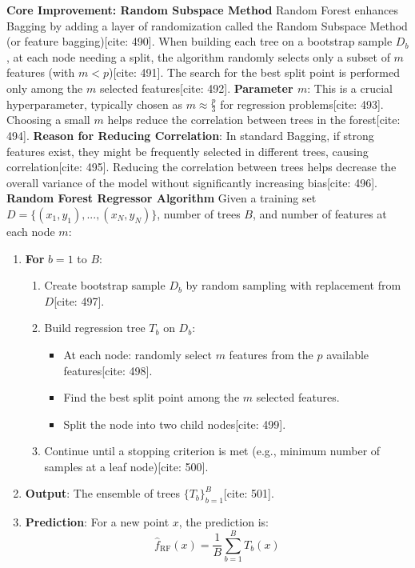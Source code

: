 \documentclass[12pt]{report}
\begin{document}
{{{\textbf*{Core Improvement: Random Subspace Method}
Random Forest enhances Bagging by adding a layer of randomization called the Random Subspace Method (or feature bagging)[cite: 490]. When building each tree on a bootstrap sample $D_b$, at each node needing a split, the algorithm randomly selects only a subset of $m$ features (with $m < p$)[cite: 491]. The search for the best split point is performed only among the $m$ selected features[cite: 492].
\textbf{Parameter $m$}: This is a crucial hyperparameter, typically chosen as $m \approx \frac{p}{3}$ for regression problems[cite: 493]. Choosing a small $m$ helps reduce the correlation between trees in the forest[cite: 494].
\textbf{Reason for Reducing Correlation}: In standard Bagging, if strong features exist, they might be frequently selected in different trees, causing correlation[cite: 495]. Reducing the correlation between trees helps decrease the overall variance of the model without significantly increasing bias[cite: 496].
\textbf*{Random Forest Regressor Algorithm}
Given a training set $D = \{(x_1, y_1), ..., (x_N, y_N)\}$, number of trees $B$, and number of features at each node $m$:

\begin{enumerate}
    \item \textbf{For} $b = 1$ to $B$:
    \begin{enumerate}
        \item Create bootstrap sample $D_b$ by random sampling with replacement from $D$[cite: 497].
        \item Build regression tree $T_b$ on $D_b$:
        \begin{itemize}
            \item At each node: randomly select $m$ features from the $p$ available features[cite: 498].
            \item Find the best split point among the $m$ selected features.
            \item Split the node into two child nodes[cite: 499].
        \end{itemize}
        \item Continue until a stopping criterion is met (e.g., minimum number of samples at a leaf node)[cite: 500].
    \end{enumerate}
    \item \textbf{Output}: The ensemble of trees $\{T_b\}_{b=1}^{B}$[cite: 501].
    \item \textbf{Prediction}: For a new point $x$, the prediction is:
    \[
    \hat{f}_{\text{RF}}(x) = \frac{1}{B} \sum_{b=1}^{B} T_b(x)
    \]
\end{enumerate}

}}}
\end{document}
